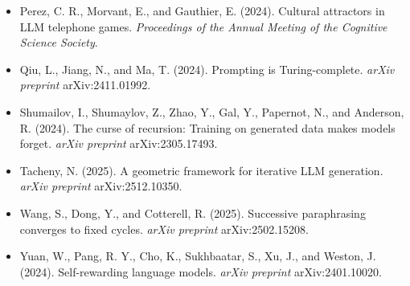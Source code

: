 \begin{itemize}
  \item Perez, C. R., Morvant, E., and Gauthier, E. (2024). Cultural attractors in LLM telephone games. \textit{Proceedings of the Annual Meeting of the Cognitive Science Society}.
\end{itemize}

\begin{itemize}
  \item Qiu, L., Jiang, N., and Ma, T. (2024). Prompting is Turing-complete. \textit{arXiv preprint} arXiv:2411.01992.
\end{itemize}

\begin{itemize}
  \item Shumailov, I., Shumaylov, Z., Zhao, Y., Gal, Y., Papernot, N., and Anderson, R. (2024). The curse of recursion: Training on generated data makes models forget. \textit{arXiv preprint} arXiv:2305.17493.
\end{itemize}

\begin{itemize}
  \item Tacheny, N. (2025). A geometric framework for iterative LLM generation. \textit{arXiv preprint} arXiv:2512.10350.
\end{itemize}

\begin{itemize}
  \item Wang, S., Dong, Y., and Cotterell, R. (2025). Successive paraphrasing converges to fixed cycles. \textit{arXiv preprint} arXiv:2502.15208.
\end{itemize}

\begin{itemize}
  \item Yuan, W., Pang, R. Y., Cho, K., Sukhbaatar, S., Xu, J., and Weston, J. (2024). Self-rewarding language models. \textit{arXiv preprint} arXiv:2401.10020.
\end{itemize}
